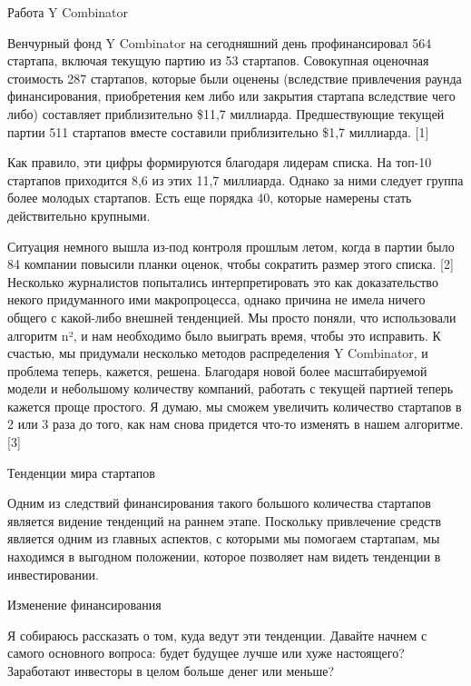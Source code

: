 \documentclass[ebook,12pt,oneside,openany]{memoir}
\begin{document}
\maketitle

Работа Y Combinator

Венчурный фонд Y Combinator на сегодняшний день профинансировал 564
стартапа, включая текущую партию из 53 стартапов. Совокупная оценочная
стоимость 287 стартапов, которые были оценены (вследствие привлечения
раунда финансирования, приобретения кем либо или закрытия стартапа
вследствие чего либо) составляет приблизительно \$11,7 миллиарда.
Предшествующие текущей партии 511 стартапов вместе составили
приблизительно \$1,7 миллиарда. [1]

Как правило, эти цифры формируются благодаря лидерам списка. На топ-10
стартапов приходится 8,6 из этих 11,7 миллиарда. Однако за ними
следует группа более молодых стартапов. Есть еще порядка 40, которые
намерены стать действительно крупными.

Ситуация немного вышла из-под контроля прошлым летом, когда в партии
было 84 компании повысили планки оценок, чтобы сократить размер этого
списка. [2] Несколько журналистов попытались интерпретировать это как
доказательство некого придуманного ими макропроцесса, однако причина
не имела ничего общего с какой-либо внешней тенденцией. Мы просто
поняли, что использовали алгоритм n², и нам необходимо было выиграть
время, чтобы это исправить. К счастью, мы придумали несколько методов
распределения Y Combinator, и проблема теперь, кажется, решена.
Благодаря новой более масштабируемой модели и небольшому количеству
компаний, работать с текущей партией теперь кажется проще простого. Я
думаю, мы сможем увеличить количество стартапов в 2 или 3 раза до
того, как нам снова придется что-то изменять в нашем алгоритме. [3]

Тенденции мира стартапов

Одним из следствий финансирования такого большого количества стартапов
является видение тенденций на раннем этапе. Поскольку привлечение
средств является одним из главных аспектов, с которыми мы помогаем
стартапам, мы находимся в выгодном положении, которое позволяет нам
видеть тенденции в инвестировании.

Изменение финансирования

Я собираюсь рассказать о том, куда ведут эти тенденции. Давайте начнем
с самого основного вопроса: будет будущее лучше или хуже настоящего?
Заработают инвесторы в целом больше денег или меньше?
\end{document}
